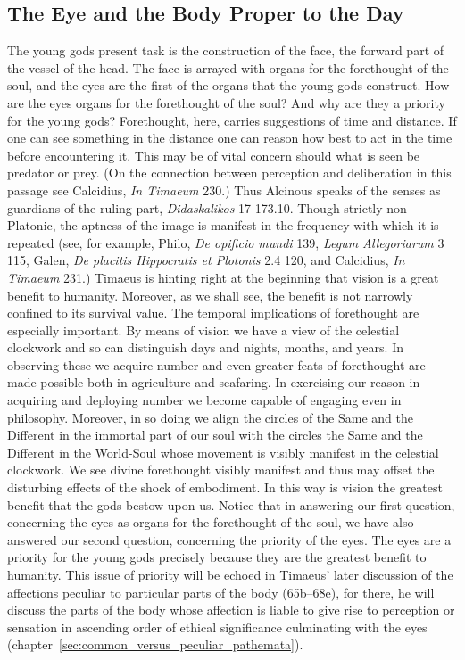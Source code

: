 \subsection{The Eye and the Body Proper to the Day} %
\label{sub:the_eye_and_the_body_proper_to_the_day}

The young gods present task is the construction of the face, the forward part of the vessel of the head. The face is arrayed with organs for the forethought of the soul, and the eyes are the first of the organs that the young gods construct. How are the eyes organs for the forethought of the soul? And why are they a priority for the young gods? Forethought, here, carries suggestions of time and distance. If one can see something in the distance one can reason how best to act in the time before encountering it. This may be of vital concern should what is seen be predator or prey. (On the connection between perception and deliberation in this passage see Calcidius, \emph{In Timaeum} 230.) Thus Alcinous speaks of the senses as guardians of the ruling part, \emph{Didaskalikos} 17 173.10. Though strictly non-Platonic, the aptness of the image is manifest in the frequency with which it is repeated (see, for example, Philo, \emph{De opificio mundi} 139, \emph{Legum Allegoriarum} 3 115, Galen, \emph{De placitis Hippocratis et Plotonis} 2.4 120, and Calcidius, \emph{In Timaeum} 231.) Timaeus is hinting right at the beginning that vision is a great benefit to humanity. Moreover, as we shall see, the benefit is not narrowly confined to its survival value. The temporal implications of forethought are especially important. By means of vision we have a view of the celestial clockwork and so can distinguish days and nights, months, and years. In observing these we acquire number and even greater feats of forethought are made possible both in agriculture and seafaring. In exercising our reason in acquiring and deploying number we become capable of engaging even in philosophy. Moreover, in so doing we align the circles of the Same and the Different in the immortal part of our soul with the circles the Same and the Different in the World-Soul whose movement is visibly manifest in the celestial clockwork. We see divine forethought visibly manifest and thus may offset the disturbing effects of the shock of embodiment. In this way is vision the greatest benefit that the gods bestow upon us. Notice that in answering our first question, concerning the eyes as organs for the forethought of the soul, we have also answered our second question, concerning the priority of the eyes. The eyes are a priority for the young gods precisely because they are the greatest benefit to humanity. This issue of priority will be echoed in Timaeus' later discussion of the affections peculiar to particular parts of the body (65b–68e), for there, he will discuss the parts of the body whose affection is liable to give rise to perception or sensation in ascending order of ethical significance culminating with the eyes (chapter~\ref{sec:common_versus_peculiar_pathemata}).

